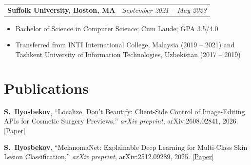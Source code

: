 \documentclass[letterpaper,11pt]{article}
\makeatletter
\newcommand{\educationEntry}[2]{%
    \vspace{1pt}\noindent
    \begin{tabular*}{\textwidth}{@{}l@{\extracolsep{\fill}}r@{}}
        \textbf{\color{accent}#1} & \textit{\color{lighttext}#2} \\
    \end{tabular*}\vspace{-3pt}
}
\makeatother
\begin{document}
\educationEntry{Suffolk University, Boston, MA}{September 2021 -- May 2023}
\begin{itemize}
    \item Bachelor of Science in Computer Science; Cum Laude; GPA 3.5/4.0
    \item Transferred from INTI International College, Malaysia (2019 -- 2021) and Tashkent University of Information Technologies, Uzbekistan (2017 -- 2019)
\end{itemize}

\section{Publications}
\begin{enumerate}[leftmargin=1.4em, itemsep=2pt, label={[\arabic*]}]
    \item \textbf{S.\ Ilyosbekov}, ``Localize, Don't Beautify: Client-Side Control of Image-Editing APIs for Cosmetic Surgery Previews,'' \textit{arXiv preprint}, arXiv:2608.02841, 2026. \href{https://arxiv.org/abs/2608.02841}{\color{linkcolor}[Paper]}
    \item \textbf{S.\ Ilyosbekov}, ``MelanomaNet: Explainable Deep Learning for Multi-Class Skin Lesion Classification,'' \textit{arXiv preprint}, arXiv:2512.09289, 2025. \href{https://arxiv.org/abs/2512.09289}{\color{linkcolor}[Paper]}
\end{enumerate}

\end{document}
